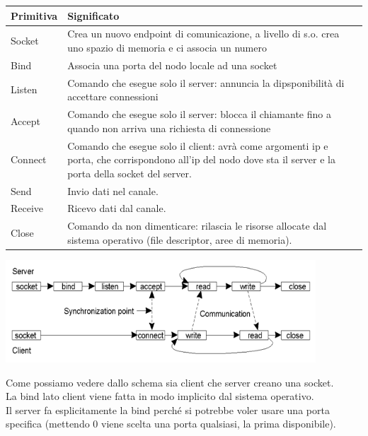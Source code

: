 \begin{table}[!h]
    \centering
    \begin{tabular}{|p{}|p{}|}
        \hline
         Primitiva & Significato \\
        \hline
          Socket & Crea un nuovo endpoint di comunicazione, a livello di s.o. crea uno spazio di memoria e ci associa un numero\\ 
          \hline
          Bind &  Associa una porta del nodo locale ad una socket\\
          \hline
          Listen & Comando che esegue solo il server: annuncia la dipsponibilità di accettare connessioni \\ 
           \hline
          Accept & Comando che esegue solo il server: blocca il chiamante fino a quando non arriva una richiesta di connessione  \\ 
          \hline
          Connect & Comando che esegue solo il client: avrà come argomenti ip e porta, che corrispondono all'ip del nodo dove sta il server e la porta della socket del server.\\ 
          \hline
          Send & Invio dati nel canale.\\
          \hline
          Receive & Ricevo dati dal canale.\\
          \hline
          Close & Comando da non dimenticare: rilascia le risorse allocate dal sistema operativo (file descriptor, aree di memoria).\\
        \hline
    \end{tabular}
\end{table}
\begin{center}
    \includegraphics[width = .7\textwidth]{images/lezione3/berkley-socket.png}
\end{center}
Come possiamo vedere dallo schema sia client che server creano una socket. \\
La bind lato client viene fatta in modo implicito dal sistema operativo.\\
Il server fa esplicitamente la bind perché si potrebbe voler usare una porta specifica (mettendo 0 viene scelta una porta qualsiasi, la prima disponibile). \\
